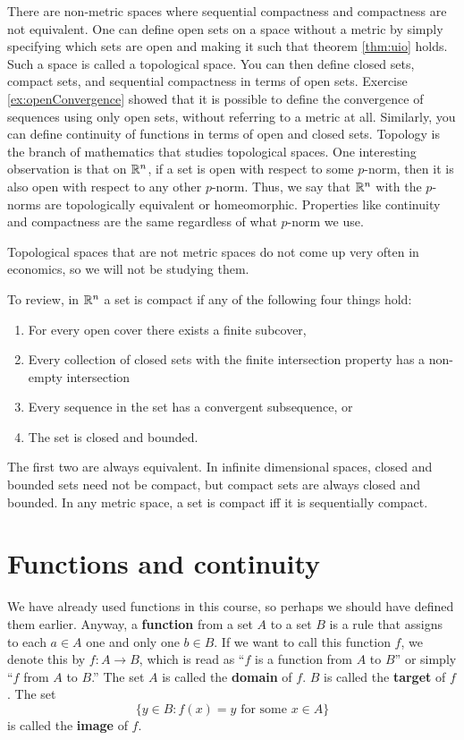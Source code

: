 \begin{remark}
  There are non-metric spaces where sequential compactness and
  compactness are not equivalent. One can define open sets on a space
  without a metric by simply specifying which sets are open and making
  it such that theorem \ref{thm:uio} holds. Such a space is called a
  topological space. You can then define closed sets, compact sets,
  and sequential compactness in terms of open sets.  Exercise
  \ref{ex:openConvergence} showed that it is possible to define the
  convergence of sequences using only open sets, without referring to
  a metric at all. Similarly, you can define continuity of functions
  in terms of open and closed sets. Topology is the branch of
  mathematics that studies topological spaces. One interesting
  observation is that on $\mathbb{R}^n$, if a set is open with respect to some
  $p$-norm, then it is also open with respect to any other
  $p$-norm. Thus, we say that $\mathbb{R}^n$ with the $p$-norms are
  topologically equivalent or homeomorphic. Properties like continuity
  and compactness are the same regardless of what $p$-norm we use.
  
  Topological spaces that are not metric spaces do not come up very
  often in economics, so we will not be studying them.
\end{remark}

To review, in $\mathbb{R}^n$ a set is compact if any of the following four
things hold:
\begin{enumerate}
\item For every open cover there exists a finite subcover,
\item Every collection of closed sets with the finite intersection
  property has a non-empty intersection
\item Every sequence in the set has a convergent subsequence, or
\item The set is closed and bounded.
\end{enumerate}
The first two are always equivalent. 
In infinite dimensional spaces, closed and bounded sets need not be
compact, but compact sets are always closed and bounded. In any metric
space, a set is compact iff it is sequentially compact.

\section{Functions and continuity}

We have already used functions in this course, so perhaps we should
have defined them earlier. Anyway, a \textbf{function} from a set $A$
to a set $B$ is a rule that assigns to each $a \in A$ one and only one
$b \in B$. If we want to call this function $f$, we denote this by
$f:A \to B$, which is read as ``$f$ is a function from $A$ to $B$'' or
simply ``$f$ from $A$ to $B$.'' The set $A$ is called the
\textbf{domain} of $f$. $B$ is called the \textbf{target} of $f$. The
set 
\[ \{y  \in B:  f(x) = y \text{ for some } x \in A \} \]
is called the \textbf{image} of $f$. 


